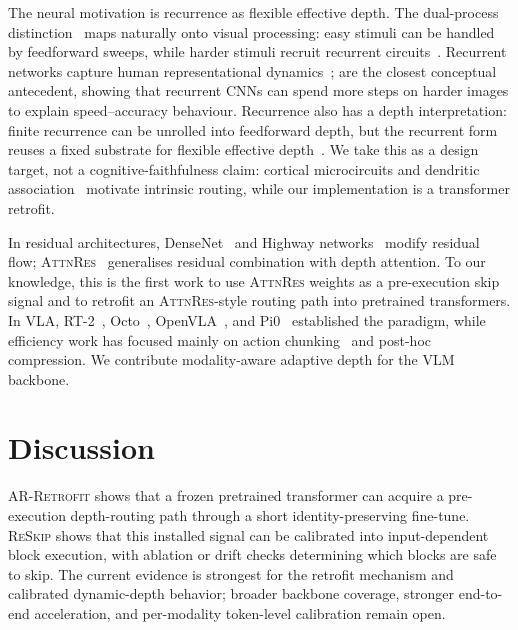 \documentclass{article}
\newcommand{\attnres}{\textsc{AttnRes}}
\newcommand{\reskip}{\textsc{ReSkip}}
\newcommand{\retrofit}{\textsc{AR-Retrofit}}
\begin{document}
The neural motivation is recurrence as flexible effective depth. The dual-process distinction~\citep{kahneman2011thinking} maps naturally onto visual processing: easy stimuli can be handled by feedforward sweeps, while harder stimuli recruit recurrent circuits~\citep{lamme2000distinct, kar2019recurrent, dicarlo2012does}. Recurrent networks capture human representational dynamics~\citep{kietzmann2019recurrence}; \citet{spoerer2020recurrent} are the closest conceptual antecedent, showing that recurrent CNNs can spend more steps on harder images to explain speed--accuracy behaviour. Recurrence also has a depth interpretation: finite recurrence can be unrolled into feedforward depth, but the recurrent form reuses a fixed substrate for flexible effective depth~\citep{vanbergen2020going}. We take this as a design target, not a cognitive-faithfulness claim: cortical microcircuits and dendritic association~\citep{bastos2012canonical, buschman2007topdown, larkum2013cellular} motivate intrinsic routing, while our implementation is a transformer retrofit.

In residual architectures, DenseNet~\citep{huang2017densely} and Highway networks~\citep{srivastava2015highway} modify residual flow; \attnres{}~\citep{chen2026attnres} generalises residual combination with depth attention. To our knowledge, this is the first work to use \attnres{} weights as a pre-execution skip signal and to retrofit an \attnres{}-style routing path into pretrained transformers. In VLA, RT-2~\citep{brohan2023rt}, Octo~\citep{team2024octo}, OpenVLA~\citep{kim2024openvla}, and Pi0~\citep{black2024pi0} established the paradigm, while efficiency work has focused mainly on action chunking~\citep{zhao2023learning} and post-hoc compression. We contribute modality-aware adaptive depth for the VLM backbone.

\section{Discussion}
\label{sec:discussion}

\retrofit{} shows that a frozen pretrained transformer can acquire a pre-execution depth-routing path through a short identity-preserving fine-tune. \reskip{} shows that this installed signal can be calibrated into input-dependent block execution, with ablation or drift checks determining which blocks are safe to skip. The current evidence is strongest for the retrofit mechanism and calibrated dynamic-depth behavior; broader backbone coverage, stronger end-to-end acceleration, and per-modality token-level calibration remain open.
\end{document}
